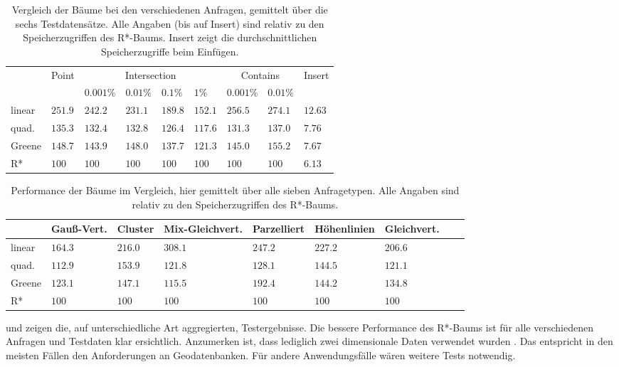 \documentclass[runningheads,a4paper]{llncs}
\begin{document}
	\begin{table}
	\caption{Vergleich der Bäume bei den verschiedenen Anfragen, gemittelt über die sechs Testdatensätze. Alle Angaben (bis auf Insert) sind relativ zu den Speicherzugriffen des R*-Baums. Insert zeigt die durchschnittlichen Speicherzugriffe beim Einfügen.}
	\label{tab:benchmark-queries}
	\begin{tabularx}{\textwidth}{l|X|X|X|X|X|X|X|X}
		& Point & \multicolumn{4}{c|}{Intersection} & \multicolumn{2}{c|}{Contains} & Insert \\
		& & $0.001\%$ & $0.01\%$ & $0.1\%$ & $1\%$ & $0.001\%$ & $0.01\%$ & \\
		\hline \hline
		linear	& $251.9$ & $242.2$ & $231.1$ & $189.8$ & $152.1$ & $256.5$ & $274.1$ & $12.63$	\\ \hline
		quad.		&	$135.3$ & $132.4$ & $132.8$ & $126.4$ & $117.6$ & $131.3$ & $137.0$ & $7.76$	\\ \hline
		Greene	& $148.7$ & $143.9$ & $148.0$ & $137.7$ & $121.3$ & $145.0$ & $155.2$ & $7.67$	\\ \hline
		R*			& $100$		& $100$		& $100$		& $100$		& $100$		& $100$		& $100$		& $6.13$
	\end{tabularx}
	\end{table}

	\begin{table}
	\caption{Performance der Bäume im Vergleich, hier gemittelt über alle sieben Anfragetypen. Alle Angaben sind relativ zu den Speicherzugriffen des R*-Baums.}
	\label{tab:benchmark-data}
	\begin{tabularx}{\textwidth}{l|X|X|X|X|X|X|X|X}
		& Gauß-Vert. & Cluster & Mix-Gleichvert. & Parzelliert & Höhenlinien & Gleichvert. \\
		\hline \hline
		linear	& $164.3$ & $216.0$ & $308.1$ & $247.2$ & $227.2$ & $206.6$	\\ \hline
		quad.		&	$112.9$ & $153.9$ & $121.8$ & $128.1$ & $144.5$ & $121.1$	\\ \hline
		Greene	& $123.1$ & $147.1$ & $115.5$ & $192.4$ & $144.2$ & $134.8$	\\ \hline
		R*			& $100$		& $100$		& $100$		& $100$		& $100$		& $100$
	\end{tabularx}
	\end{table}

	 und  zeigen die, auf unterschiedliche Art aggregierten, Testergebnisse. Die bessere Performance des R*-Baums ist für alle verschiedenen Anfragen und Testdaten klar ersichtlich. Anzumerken ist, dass lediglich zwei dimensionale Daten verwendet wurden \citep[328][vgl.]{Beckmann:1990}. Das entspricht in den meisten Fällen den Anforderungen an Geodatenbanken. Für andere Anwendungsfälle wären weitere Tests notwendig.
\end{document}
